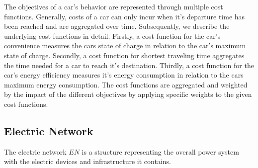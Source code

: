 The objectives of a car's behavior are represented through multiple cost functions. Generally, costs of a car can only incur when it's departure time has been reached and are aggregated over time. Subsequently, we describe the underlying cost functions in detail. Firstly, a cost function for the car's convenience measures the cars state of charge in relation to the car's maximum state of charge. Secondly, a cost function for shortest traveling time aggregates the time needed for a car to reach it's destination. Thirdly, a cost function for the car's energy efficiency measures it's energy consumption in relation to the cars maximum energy consumption. The cost functions are aggregated and weighted by the impact of the different objectives by applying specific weights to the given cost functions.

\subsection{Electric Network}

The electric network $EN$ is a structure representing the overall power system with the electric devices and infrastructure it contains.

